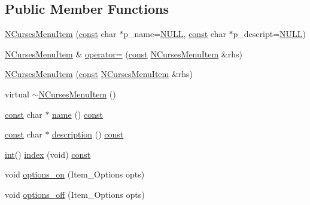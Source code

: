 \subsection*{Public Member Functions}
\begin{DoxyCompactItemize}
\item 
\hyperlink{class_n_curses_menu_item_a72395ecae05866d154c0c25e57084620}{N\-Curses\-Menu\-Item} (\hyperlink{term__entry_8h_a57bd63ce7f9a353488880e3de6692d5a}{const} char $\ast$p\-\_\-name=\hyperlink{internal_8h_a070d2ce7b6bb7e5c05602aa8c308d0c4}{N\-U\-L\-L}, \hyperlink{term__entry_8h_a57bd63ce7f9a353488880e3de6692d5a}{const} char $\ast$p\-\_\-descript=\hyperlink{internal_8h_a070d2ce7b6bb7e5c05602aa8c308d0c4}{N\-U\-L\-L})
\item 
\hyperlink{class_n_curses_menu_item}{N\-Curses\-Menu\-Item} \& \hyperlink{class_n_curses_menu_item_afb51b3d1a9ece397f09aa9c000b3ed68}{operator=} (\hyperlink{term__entry_8h_a57bd63ce7f9a353488880e3de6692d5a}{const} \hyperlink{class_n_curses_menu_item}{N\-Curses\-Menu\-Item} \&rhs)
\item 
\hyperlink{class_n_curses_menu_item_a28d860e19e5804762796acd5ae03ba9e}{N\-Curses\-Menu\-Item} (\hyperlink{term__entry_8h_a57bd63ce7f9a353488880e3de6692d5a}{const} \hyperlink{class_n_curses_menu_item}{N\-Curses\-Menu\-Item} \&rhs)
\item 
virtual \hyperlink{class_n_curses_menu_item_a77691d7c3350b397dac92d9f9211a7ee}{$\sim$\-N\-Curses\-Menu\-Item} ()
\item 
\hyperlink{term__entry_8h_a57bd63ce7f9a353488880e3de6692d5a}{const} char $\ast$ \hyperlink{class_n_curses_menu_item_aa09b8861edac73d9ec70b4f8c57d674a}{name} () \hyperlink{term__entry_8h_a57bd63ce7f9a353488880e3de6692d5a}{const} 
\item 
\hyperlink{term__entry_8h_a57bd63ce7f9a353488880e3de6692d5a}{const} char $\ast$ \hyperlink{class_n_curses_menu_item_a701f56a5013d38a2aa7c67a78060a39e}{description} () \hyperlink{term__entry_8h_a57bd63ce7f9a353488880e3de6692d5a}{const} 
\item 
\hyperlink{term__entry_8h_ad65b480f8c8270356b45a9890f6499ae}{int}() \hyperlink{class_n_curses_menu_item_a6d57ab202720a36796010c3d06db16d6}{index} (void) \hyperlink{term__entry_8h_a57bd63ce7f9a353488880e3de6692d5a}{const} 
\item 
void \hyperlink{class_n_curses_menu_item_a7e69ba717e3654d6d469a59997378bf7}{options\-\_\-on} (Item\-\_\-\-Options opts)
\item 
void \hyperlink{class_n_curses_menu_item_a3b4d520f176127b4a9d833ca8704bb57}{options\-\_\-off} (Item\-\_\-\-Options opts)

\end{DoxyCompactItemize}
